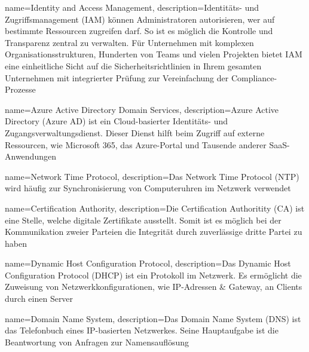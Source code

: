 


{
    name=Identity and Access Management,
    description={Identitäts- und Zugriffsmanagement (IAM) können Administratoren autorisieren, wer auf bestimmte Ressourcen zugreifen darf.
            So ist es möglich die Kontrolle und Transparenz zentral zu verwalten.
            Für Unternehmen mit komplexen Organisationsstrukturen, Hunderten von Teams und vielen Projekten bietet IAM eine einheitliche Sicht auf die Sicherheitsrichtlinien in Ihrem gesamten Unternehmen mit integrierter Prüfung zur Vereinfachung der Compliance-Prozesse}
}

{
    name=Azure Active Directory Domain Services,
    description={Azure Active Directory (Azure AD) ist ein Cloud-basierter Identitäts- und Zugangsverwaltungsdienst.
            Dieser Dienst hilft beim Zugriff auf externe Ressourcen, wie Microsoft 365, das Azure-Portal und Tausende anderer SaaS-Anwendungen}
}

{
    name=Network Time Protocol,
    description={Das Network Time Protocol (NTP) wird häufig zur Synchronisierung von Computeruhren im Netzwerk verwendet}
}

{
    name=Certification Authority,
    description={Die Certification Authoritity (CA) ist eine Stelle, welche digitale Zertifikate ausstellt. Somit ist es möglich bei der Kommunikation zweier Parteien die Integrität durch zuverlässige dritte Partei zu haben}
}

{
    name=Dynamic Host Configuration Protocol,
    description={Das Dynamic Host Configuration Protocol (DHCP) ist ein Protokoll im Netzwerk. Es ermöglicht die Zuweisung von Netzwerkkonfigurationen, wie IP-Adressen \& Gateway, an Clients durch einen Server}
}

{
    name=Domain Name System,
    description={Das Domain Name System (DNS) ist das Telefonbuch eines IP-basierten Netzwerkes. Seine Hauptaufgabe ist die Beantwortung von Anfragen zur Namensauflösung}
}

